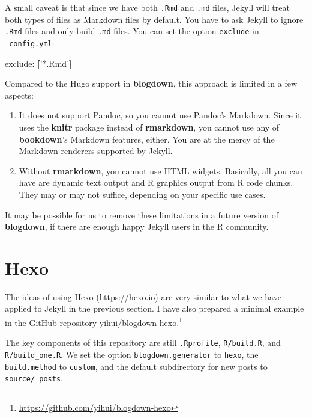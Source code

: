 \documentclass[12pt,]{krantz}
\makeatletter
\newenvironment{Shaded}{\begin{snugshade}}{\end{snugshade}}
\newcommand{\KeywordTok}[1]{\textcolor[rgb]{0.13,0.29,0.53}{\textbf{#1}}}
\newcommand{\StringTok}[1]{\textcolor[rgb]{0.31,0.60,0.02}{#1}}
\newcommand{\FunctionTok}[1]{\textcolor[rgb]{0.00,0.00,0.00}{#1}}
\newcommand{\AttributeTok}[1]{\textcolor[rgb]{0.77,0.63,0.00}{#1}}
\renewcommand{\href}[2]{#2\footnote{\url{#1}}}
\newenvironment{kframe}{%
\medskip{}
\setlength{\fboxsep}{.8em}
 \def\at@end@of@kframe{}%
 \ifinner\ifhmode%
  \def\at@end@of@kframe{\end{minipage}}%
  \begin{minipage}{\columnwidth}%
 \fi\fi%
 \def\FrameCommand##1{\hskip\@totalleftmargin \hskip-\fboxsep
 \colorbox{shadecolor}{##1}\hskip-\fboxsep
     \hskip-\linewidth \hskip-\@totalleftmargin \hskip\columnwidth}%
 \MakeFramed {\advance\hsize-\width
   \@totalleftmargin\z@ \linewidth\hsize
   \@setminipage}}%
 {\par\unskip\endMakeFramed%
 \at@end@of@kframe}
\renewenvironment{Shaded}{\begin{kframe}}{\end{kframe}}
\theoremstyle{definition}
\theoremstyle{definition}
\theoremstyle{definition}
\theoremstyle{remark}
\makeatother
\begin{document}
A small caveat is that since we have both \texttt{.Rmd} and \texttt{.md}
files, Jekyll will treat both types of files as Markdown files by
default. You have to ask Jekyll to ignore \texttt{.Rmd} files and only
build \texttt{.md} files. You can set the option \texttt{exclude} in
\texttt{\_config.yml}:

\begin{Shaded}
\begin{Highlighting}[]
\FunctionTok{exclude:}\AttributeTok{ }\KeywordTok{[}\StringTok{'*.Rmd'}\KeywordTok{]}
\end{Highlighting}
\end{Shaded}

Compared to the Hugo support in \textbf{blogdown}, this approach is
limited in a few aspects:

\begin{enumerate}
\def\labelenumi{\arabic{enumi}.}
\item
  It does not support Pandoc, so you cannot use Pandoc's Markdown. Since
  it uses the \textbf{knitr} package instead of \textbf{rmarkdown}, you
  cannot use any of \textbf{bookdown}'s Markdown features, either. You
  are at the mercy of the Markdown renderers supported by Jekyll.
\item
  Without \textbf{rmarkdown}, you cannot use HTML widgets. Basically,
  all you can have are dynamic text output and R graphics output from R
  code chunks. They may or may not suffice, depending on your specific
  use cases.
\end{enumerate}

It may be possible for us to remove these limitations in a future
version of \textbf{blogdown}, if there are enough happy Jekyll users in
the R community.

\section{Hexo}\label{hexo}

The ideas of using Hexo (\url{https://hexo.io}) are very
similar to what we have applied to Jekyll in the previous section. I
have also prepared a minimal example in the GitHub repository
\href{https://github.com/yihui/blogdown-hexo}{yihui/blogdown-hexo.}

The key components of this repository are still \texttt{.Rprofile},
\texttt{R/build.R}, and \texttt{R/build\_one.R}. We set the option
\texttt{blogdown.generator} to \texttt{hexo}, the \texttt{build.method}
to \texttt{custom}, and the default subdirectory for new posts to
\texttt{source/\_posts}.
\end{document}
